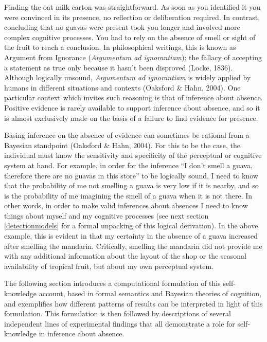 \documentclass[12pt,twoside]{reedthesis}
\begin{document}
Finding the oat milk carton was straightforward. As soon as you identified it you were convinced in its presence, no reflection or deliberation required. In contrast, concluding that no guavas were present took you longer and involved more complex cognitive processes. You had to rely on the absence of smell or sight of the fruit to reach a conclusion. In philosophical writings, this is known as Argument from Ignorance (\emph{Argumentum ad ignorantiam}): the fallacy of accepting a statement as true only because it hasn't been disproved (Locke, 1836). Although logically unsound, \emph{Argumentum ad ignorantiam} is widely applied by humans in different situations and contexts (Oaksford \& Hahn, 2004). One particular context which invites such reasoning is that of inference about absence. Positive evidence is rarely available to support inference about absence, and so it is almost exclusively made on the basis of a failure to find evidence for presence.

Basing inference on the absence of evidence can sometimes be rational from a Bayesian standpoint (Oaksford \& Hahn, 2004). For this to be the case, the individual must know the sensitivity and specificity of the perceptual or cognitive system at hand. For example, in order for the inference ``I don't smell a guava, therefore there are no guavas in this store'' to be logically sound, I need to know that the probability of me not smelling a guava is very low if it is nearby, and so is the probability of me imagining the smell of a guava when it is not there. In other words, in order to make valid inferences about absences I need to know things about myself and my cognitive processes (see next section \ref{detectionmodels} for a formal unpacking of this logical derivation). In the above example, this is evident in that my certainty in the absence of a guava increased after smelling the mandarin. Critically, smelling the mandarin did not provide me with any additional information about the layout of the shop or the seasonal availability of tropical fruit, but about my own perceptual system.

The following section introduces a computational formulation of this self-knowledge account, based in formal semantics and Bayesian theories of cognition, and exemplifies how different patterns of results can be interpreted in light of this formulation. This formulation is then followed by descriptions of several independent lines of experimental findings that all demonstrate a role for self-knowledge in inference about absence.
\end{document}
